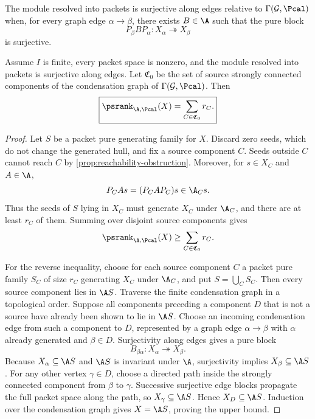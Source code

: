 \begin{definition}
\label{def:edge-surjective}
The module resolved into packets is surjective along edges relative to $\Gamma(\mathcal G,\Pcal)$ when, for every graph edge $\alpha\to\beta$, there exists $B\in\A$ such that the pure block
\[
P_\beta BP_\alpha:X_\alpha\twoheadrightarrow X_\beta
\]
is surjective.
\end{definition}

\begin{theorem}
\label{thm:source-component-rank}
Assume $I$ is finite, every packet space is nonzero, and the module resolved into packets is surjective along edges.  Let $\mathfrak C_0$ be the set of source strongly connected components of the condensation graph of $\Gamma(\mathcal G,\Pcal)$.  Then
\[
\boxed{
\psrank_{\A,\Pcal}(X)
=
\sum_{C\in\mathfrak C_0}r_C.
}
\]
\end{theorem}

\begin{proof}
Let $S$ be a packet pure generating family for $X$.  Discard zero seeds, which do not change the generated hull, and fix a source component $C$.  Seeds outside $C$ cannot reach $C$ by \cref{prop:reachability-obstruction}.  Moreover, for $s\in X_C$ and $A\in\A$,
\[
P_CAs=(P_CAP_C)s\in\A_Cs.
\]
Thus the seeds of $S$ lying in $X_C$ must generate $X_C$ under $\A_C$, and there are at least $r_C$ of them.  Summing over disjoint source components gives
\[
\psrank_{\A,\Pcal}(X)
\geq
\sum_{C\in\mathfrak C_0}r_C.
\]

For the reverse inequality, choose for each source component $C$ a packet pure family $S_C$ of size $r_C$ generating $X_C$ under $\A_C$, and put $S=\bigcup_CS_C$.  Then every source component lies in $\A S$.  Traverse the finite condensation graph in a topological order.  Suppose all components preceding a component $D$ that is not a source have already been shown to lie in $\A S$.  Choose an incoming condensation edge from such a component to $D$, represented by a graph edge $\alpha\to\beta$ with $\alpha$ already generated and $\beta\in D$.  Surjectivity along edges gives a pure block
\[
B_{\beta\alpha}:X_\alpha\twoheadrightarrow X_\beta.
\]
Because $X_\alpha\subseteq\A S$ and $\A S$ is invariant under $\A$, surjectivity implies $X_\beta\subseteq\A S$.  For any other vertex $\gamma\in D$, choose a directed path inside the strongly connected component from $\beta$ to $\gamma$.  Successive surjective edge blocks propagate the full packet space along the path, so $X_\gamma\subseteq\A S$.  Hence $X_D\subseteq\A S$.  Induction over the condensation graph gives $X=\A S$, proving the upper bound.
\end{proof}

